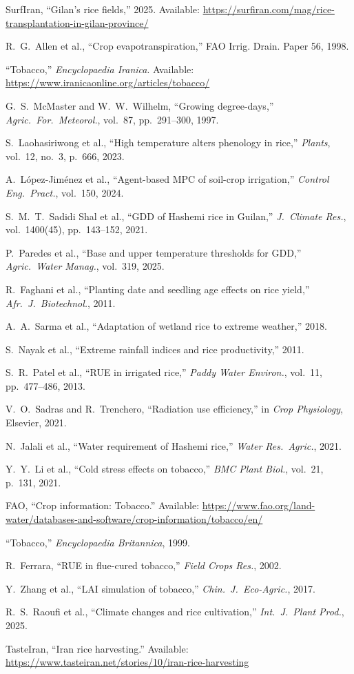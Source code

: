 \documentclass[12pt, a4paper]{article}
\begin{document}
\begin{enumerate}[label={[\arabic*]}, leftmargin=*]
\item SurfIran, ``Gilan's rice fields,'' 2025. Available: \url{https://surfiran.com/mag/rice-transplantation-in-gilan-province/}
\item R.~G.~Allen et al., ``Crop evapotranspiration,'' FAO Irrig. Drain. Paper 56, 1998.
\item ``Tobacco,'' \emph{Encyclopaedia Iranica}. Available: \url{https://www.iranicaonline.org/articles/tobacco/}
\item G.~S.~McMaster and W.~W.~Wilhelm, ``Growing degree-days,'' \emph{Agric.\ For.\ Meteorol.}, vol.~87, pp.~291--300, 1997.
\item S.~Laohasiriwong et al., ``High temperature alters phenology in rice,'' \emph{Plants}, vol.~12, no.~3, p.~666, 2023.
\item A.~L\'{o}pez-Jim\'{e}nez et al., ``Agent-based MPC of soil-crop irrigation,'' \emph{Control Eng.\ Pract.}, vol.~150, 2024.
\item S.~M.~T.~Sadidi Shal et al., ``GDD of Hashemi rice in Guilan,'' \emph{J.\ Climate Res.}, vol.~1400(45), pp.~143--152, 2021.
\item P.~Paredes et al., ``Base and upper temperature thresholds for GDD,'' \emph{Agric.\ Water Manag.}, vol.~319, 2025.
\item R.~Faghani et al., ``Planting date and seedling age effects on rice yield,'' \emph{Afr.\ J.\ Biotechnol.}, 2011.
\item A.~A.~Sarma et al., ``Adaptation of wetland rice to extreme weather,'' 2018.
\item S.~Nayak et al., ``Extreme rainfall indices and rice productivity,'' 2011.
\item S.~R.~Patel et al., ``RUE in irrigated rice,'' \emph{Paddy Water Environ.}, vol.~11, pp.~477--486, 2013.
\item V.~O.~Sadras and R.~Trenchero, ``Radiation use efficiency,'' in \emph{Crop Physiology}, Elsevier, 2021.
\item N.~Jalali et al., ``Water requirement of Hashemi rice,'' \emph{Water Res.\ Agric.}, 2021.
\item Y.~Y.~Li et al., ``Cold stress effects on tobacco,'' \emph{BMC Plant Biol.}, vol.~21, p.~131, 2021.
\item FAO, ``Crop information: Tobacco.'' Available: \url{https://www.fao.org/land-water/databases-and-software/crop-information/tobacco/en/}
\item ``Tobacco,'' \emph{Encyclopaedia Britannica}, 1999.
\item R.~Ferrara, ``RUE in flue-cured tobacco,'' \emph{Field Crops Res.}, 2002.
\item Y.~Zhang et al., ``LAI simulation of tobacco,'' \emph{Chin.\ J.\ Eco-Agric.}, 2017.
\item R.~S.~Raoufi et al., ``Climate changes and rice cultivation,'' \emph{Int.\ J.\ Plant Prod.}, 2025.
\item TasteIran, ``Iran rice harvesting.'' Available: \url{https://www.tasteiran.net/stories/10/iran-rice-harvesting}
\end{enumerate}
\end{document}
